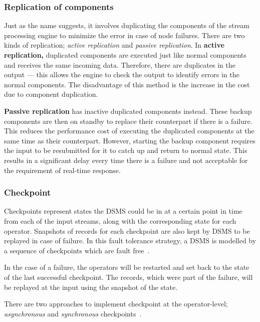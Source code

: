 \subsubsection{Replication of components}
Just as the name suggests, it involves duplicating the components of the stream processing
engine to minimize the error in case of node failures. There are two kinds of replication; 
\emph{active replication} and \emph{passive replication}. In \textbf{active replication,}
duplicated components are executed just like normal components and receives the same incoming data. 
Therefore, there are duplicates in the output --- this allows the engine to check the 
output to identify errors in the normal components. The disadvantage of this method is 
the increase in the cost due to component duplication. 

\textbf{Passive replication} has inactive duplicated components instead. These backup
components are then on standby to replace their counterpart if there is a failure. This 
reduces the performance cost of executing the duplicated components at the same 
time as their counterpart. However, starting the backup component requires the input 
to be resubmitted for it to catch up and return to normal state. This results in a significant 
delay every time there is a failure and not acceptable for the requirement of real-time response. 


\subsubsection{Checkpoint}

Checkpoints represent states the DSMS could be in at a certain point in 
time from each of the input streams, along with the corresponding 
state for each operator. Snapshots of records for each checkpoint are also kept 
by DSMS to be replayed in case of failure. 
In this fault tolerance strategy, a DSMS is modelled by a sequence of 
checkpoints which are fault free~\cite{fault_tolerance_dsms}. 

In the case of a failure, the operators will be restarted and set back to the state of the 
last successful checkpoint. The records, which were part of the failure, will be replayed
at the input using the snapshot of the state. 

There are two approaches to implement checkpoint at the operator-level; 
\emph{asynchronous} and \emph{synchronous} checkpoints~\cite{fault_tolerance_dsms}.

